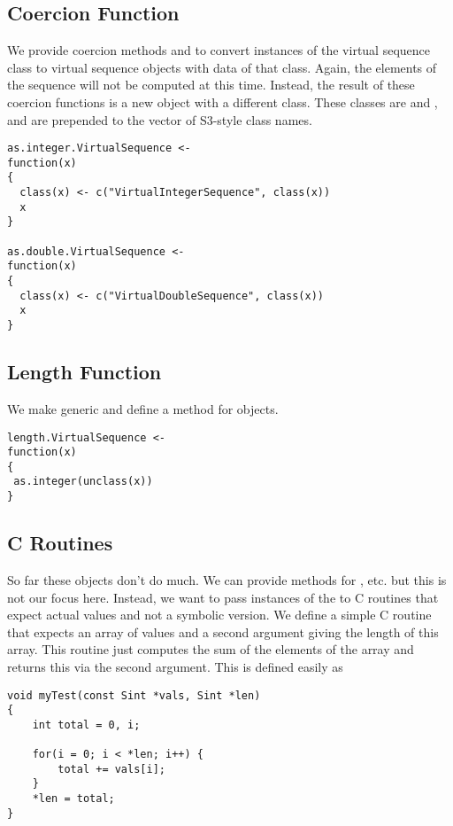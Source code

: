 \documentclass{article}
\begin{document}
\subsection{Coercion Function}
We provide coercion methods  and
 to convert instances of the virtual sequence
class to virtual sequence objects with data of that class.  Again, the
elements of the sequence will not be computed at this time.  Instead,
the result of these coercion functions is a new object with a
different class.  These classes are 
and , and are prepended to the vector of
S3-style class names.

\begin{verbatim}
as.integer.VirtualSequence <-
function(x)
{
  class(x) <- c("VirtualIntegerSequence", class(x))
  x
}

as.double.VirtualSequence <-
function(x)
{
  class(x) <- c("VirtualDoubleSequence", class(x))
  x
}
\end{verbatim}


\subsection{Length Function}
We make  generic
and define a method for 
objects. 

\begin{verbatim}
length.VirtualSequence <-
function(x)
{
 as.integer(unclass(x))
}
\end{verbatim}

\subsection{C Routines}
So far these objects don't do much. We can provide methods for
\SFunction{[}, etc. but this is not our focus here.  Instead, we want
to pass instances of the  to C routines that
expect actual values and not a symbolic version.  We define a simple C
routine that expects an array of  values and a second
argument giving the length of this array.
This routine just computes the sum of the elements of the array and
returns this via the second argument.
This is defined easily as
\begin{verbatim}
void myTest(const Sint *vals, Sint *len)
{
    int total = 0, i;

    for(i = 0; i < *len; i++) {
        total += vals[i];
    }
    *len = total;
}
\end{verbatim}
\end{document}
